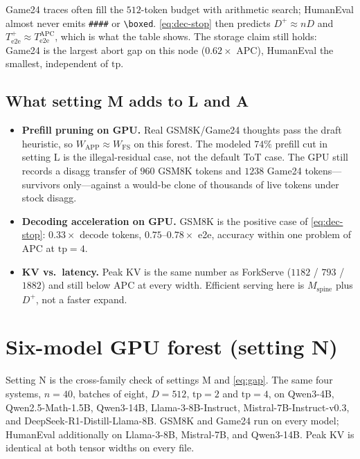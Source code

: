 \documentclass[11pt,a4paper]{article}
\begin{document}
Game24 traces often fill the $512$-token budget with arithmetic search; HumanEval almost never emits \texttt{\#\#\#\#} or \texttt{\textbackslash boxed}.
\eqref{eq:dec-stop} then predicts $D^{+}\approx nD$ and $T_{\mathrm{e2e}}^{+}\approx T_{\mathrm{e2e}}^{\mathrm{APC}}$, which is what the table shows.
The storage claim still holds: Game24 is the largest abort gap on this node ($0.62\times$ APC), HumanEval the smallest, independent of $\mathrm{tp}$.

\subsection{What setting M adds to L and A}

\begin{itemize}
\item \textbf{Prefill pruning on GPU.} Real GSM8K/Game24 thoughts pass the draft heuristic, so $W_{\mathrm{APP}}\approx W_{\mathrm{FS}}$ on this forest.
The modeled $74\%$ prefill cut in setting L is the illegal-residual case, not the default ToT case.
The GPU still records a disagg transfer of $960$ GSM8K tokens and $1238$ Game24 tokens---survivors only---against a would-be clone of thousands of live tokens under stock disagg.
\item \textbf{Decoding acceleration on GPU.} GSM8K is the positive case of \eqref{eq:dec-stop}: $0.33\times$ decode tokens, $0.75$--$0.78\times$ e2e, accuracy within one problem of APC at $\mathrm{tp}{=}4$.
\item \textbf{KV vs.\ latency.} Peak KV is the same number as ForkServe ($1182$ / $793$ / $1882$) and still below APC at every width.
Efficient serving here is $M_{\mathrm{spine}}$ plus $D^{+}$, not a faster expand.
\end{itemize}

\section{Six-model GPU forest (setting N)}

Setting N is the cross-family check of settings M and \eqref{eq:gap}.
The same four systems, $n{=}40$, batches of eight, $D{=}512$, $\mathrm{tp}{=}2$ and $\mathrm{tp}{=}4$, on Qwen3-4B, Qwen2.5-Math-1.5B, Qwen3-14B, Llama-3-8B-Instruct, Mistral-7B-Instruct-v0.3, and DeepSeek-R1-Distill-Llama-8B.
GSM8K and Game24 run on every model; HumanEval additionally on Llama-3-8B, Mistral-7B, and Qwen3-14B.
Peak KV is identical at both tensor widths on every file.
\end{document}
